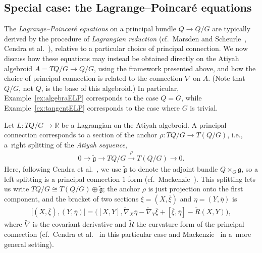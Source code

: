 \documentclass[10pt,a4paper]{amsart}
\numberwithin{equation}{section}
\begin{document}
\subsection{Special case: the Lagrange--Poincar\'e equations} \label{sec:lagrangePoincare}

The \emph{Lagrange--Poincar\'e equations} on a principal bundle $ Q \rightarrow Q / G $ are typically derived by the procedure of \emph{Lagrangian reduction} (cf.\ Marsden and Scheurle~\cite{MaSc1993b}, Cendra et al.~\cite{CeMaRa2001}), relative to a particular choice of principal connection. We now discuss how these equations may instead be obtained directly on the Atiyah algebroid $ A = T Q / G \rightarrow Q / G $, using the framework presented above, and how the choice of principal connection is related to the connection $ \nabla $ on $A$. (Note that $ Q / G $, not $Q$, is the base of this algebroid.) In particular,
Example~\ref{ex:algebraELP} corresponds to the case $ Q = G $, while Example~\ref{ex:tangentELP} corresponds to the case where $G$ is trivial.

Let $ L \colon T Q / G \rightarrow \mathbb{R} $ be a Lagrangian on the Atiyah algebroid. A principal connection corresponds to a section of the anchor $ \rho \colon T Q / G \rightarrow T ( Q / G ) $, i.e., a~right splitting of the \emph{Atiyah sequence},
\begin{gather} \label{eqn:atiyahSequence}
 0 \rightarrow \widetilde{ \mathfrak{g} } \rightarrow T Q / G \xrightarrow{ \rho } T ( Q / G ) \rightarrow 0 .
 \end{gather}
Here, following Cendra et al.~\cite{CeMaRa2001}, we use $ \widetilde{ \mathfrak{g} } $ to denote the adjoint bundle $ Q \times _G \mathfrak{g} $, so a left splitting is a principal connection $1$-form (cf.\ Mackenzie~\cite[Chapter~5]{Mackenzie2005}). This splitting lets us write $ T Q / G \cong T ( Q / G ) \oplus \widetilde{ \mathfrak{g} } $; the anchor $\rho$ is just projection onto the f\/irst component, and the bracket of two sections $ \xi = ( X, \overline{ \xi } ) $ and $ \eta = ( Y , \overline{ \eta } ) $ is
 \begin{gather} \label{eqn:atiyahBracket}
 \bigl[ ( X, \overline{ \xi } ) , ( Y , \overline{ \eta } ) \bigr] = \bigl( [X, Y ] , \widetilde{ \nabla } _X \overline{ \eta } - \widetilde{ \nabla } _Y \overline{ \xi } + [ \overline{ \xi } , \overline{ \eta } ] - \widetilde{ R } ( X, Y ) \bigr) ,
 \end{gather}
 where $ \widetilde{ \nabla } $ is the covariant derivative and $ \widetilde{ R } $ the curvature form of the principal connection (cf.\ Cendra et al.~\cite[Theorem~5.2.4]{CeMaRa2001} in this particular case and Mackenzie~\cite[Theorem~7.3.7]{Mackenzie2005} in a~more general setting).
\end{document}
